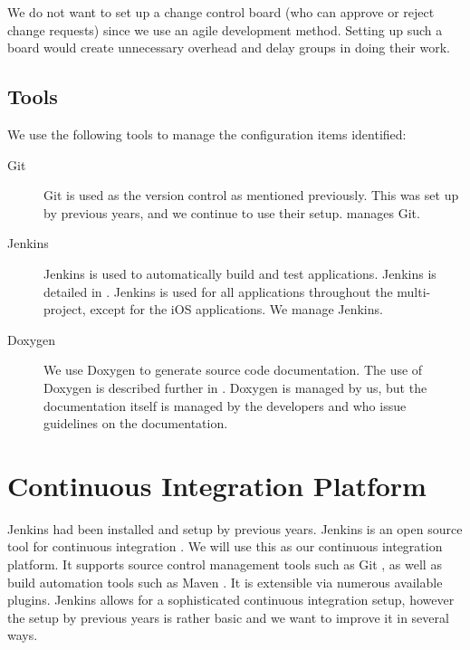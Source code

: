 We do not want to set up a change control board (who can approve or reject change requests) since we use an agile development method. Setting up such a board would create unnecessary overhead and delay groups in doing their work.

\subsection{Tools}
We use the following tools to manage the configuration items identified:

\begin{description}
  \item[Git] Git is used as the version control as mentioned previously. This was set up by previous years, and we continue to use their setup.  manages Git.
  \item[Jenkins] Jenkins is used to automatically build and test applications. Jenkins is detailed in . Jenkins is used for all applications throughout the multi-project, except for the iOS applications. We manage Jenkins.
  \item[Doxygen] We use Doxygen to generate source code documentation. The use of Doxygen is described further in . Doxygen is managed by us, but the documentation itself is managed by the developers and  who issue guidelines on the documentation.
\end{description}

\section{Continuous Integration Platform}\label{sec:jenkins}
Jenkins had been installed and setup by previous years. Jenkins is an open source tool for continuous integration \parencite{JenkinsWebsite}. We will use this as our continuous integration platform. It supports source control management tools such as Git \parencite{gitwebsite}, as well as build automation tools such as Maven \parencite{mavenwebsite}. It is extensible via numerous available plugins. Jenkins allows for a sophisticated continuous integration setup, however the setup by previous years is rather basic and we want to improve it in several ways.


